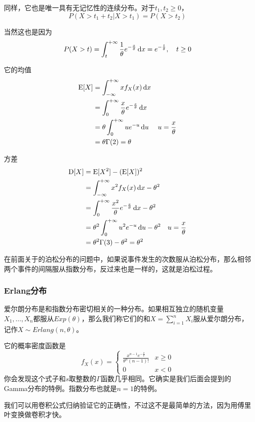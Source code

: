 同样，它也是唯一具有无记忆性的连续分布。对于$t_1,t_2 \geq 0$，
\[
P(X>t_1+t_2| X>t_1)=P(X>t_2)
\]

当然这也是因为
\[
P(X>t) = \int_t^{+\infty}\frac 1\theta e^{-\frac x\theta}\mathop{}\!\mathrm{d} x=e^{-\frac t\theta},\quad t\geq0
\]

它的均值
\begin{align*}
\operatorname{E}[X]&= \int_{-\infty}^{+\infty}xf_X(x)\mathop{}\!\mathrm{d} x\\
&= \int_{0}^{+\infty}\frac x\theta e^{-\frac x\theta}\mathop{}\!\mathrm{d} x\\
&= \theta\int_{0}^{+\infty}u e^{-u}\mathop{}\!\mathrm{d} u& u=\frac{x}{\theta}\\
&= \theta\Gamma(2)=\theta\\
\end{align*}

方差
\begin{align*}
\operatorname{D}[X] &= \operatorname{E}[X^2] -(\operatorname{E}[X])^2 \\
&= \int_{-\infty}^{+\infty}x^2f_X(x)\mathop{}\!\mathrm{d} x - \theta^2\\
&= \int_{0}^{+\infty}\frac {x^2}{\theta} e^{-\frac x\theta}\mathop{}\!\mathrm{d} x - \theta^2\\
&= \theta^2\int_{0}^{+\infty}u^2 e^{-u}\mathop{}\!\mathrm{d} u  - \theta^2 & u=\frac{x}{\theta}\\
&= \theta^2\Gamma(3) - \theta^2=\theta^2\\
\end{align*}

在前面关于的泊松分布的问题中，如果说事件发生的次数服从泊松分布，那么相邻两个事件的间隔服从指数分布，反过来也是一样的，这就是泊松过程。

\subsubsection{Erlang分布}
爱尔朗分布是和指数分布密切相关的一种分布。如果相互独立的随机变量$X_1,\ldots,X_n$都服从$Exp(\theta)$，那么我们称它们的和$X=\sum_{i=1}^nX_i$服从爱尔朗分布，记作$X\sim Erlang(n,\theta)$。

它的概率密度函数是
\[
f_X(x) = \begin{cases}
    \frac{x^{n-1}e^{-\frac{x}{\theta}}}{\theta^n(n-1)!} & x \geq 0\\
    0 & x< 0
\end{cases}
\]
你会发现这个式子和$s$取整数的$\Gamma$函数几乎相同。它确实是我们后面会提到的Gamma分布的特例。指数分布也就是$n=1$的特例。

我们可以用卷积公式归纳验证它的正确性，不过这不是最简单的方法，因为用傅里叶变换做卷积才快。

